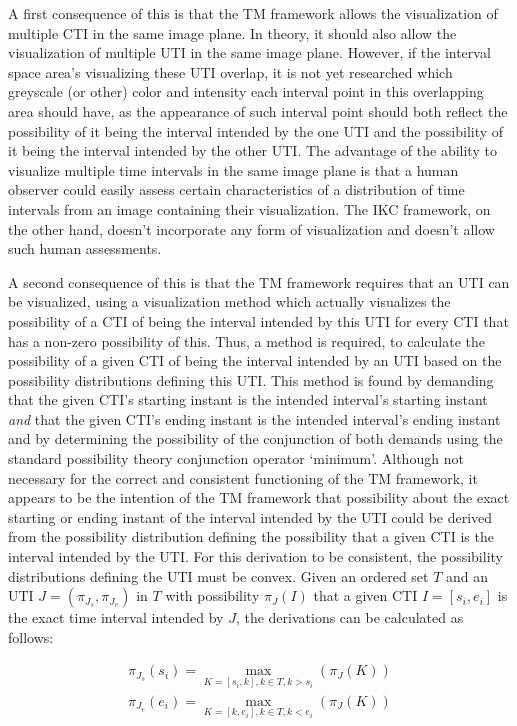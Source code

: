 A first consequence of this is that the TM framework allows the visualization of multiple CTI in the same image plane. In theory, it should also allow the visualization of multiple UTI in the same image plane. However, if the interval space area's visualizing these UTI overlap, it is not yet researched which greyscale (or other) color and intensity each interval point in this overlapping area should have, as the appearance of such interval point should both reflect the possibility of it being the interval intended by the one UTI and the possibility of it being the interval intended by the other UTI. The advantage of the ability to visualize multiple time intervals in the same image plane is that a human observer could easily assess certain characteristics of a distribution of time intervals from an image containing their visualization. The IKC framework, on the other hand, doesn't incorporate any form of visualization and doesn't allow such human assessments.

A second consequence of this is that the TM framework requires that an UTI can be visualized, using a visualization method which actually visualizes the possibility of a CTI of being the interval intended by this UTI for every CTI that has a non-zero possibility of this. Thus, a method is required, to calculate the possibility of a given CTI of being the interval intended by an UTI based on the possibility distributions defining this UTI. This method is found by demanding that the given CTI's starting instant is the intended interval's starting instant \emph{and} that the given CTI's ending instant is the intended interval's ending instant and by determining the possibility of the conjunction of both demands using the standard possibility theory conjunction operator `minimum'. Although not necessary for the correct and consistent functioning of the TM framework, it appears to be the intention of the TM framework that possibility about the exact starting or ending instant of the interval intended by the UTI could be derived from the possibility distribution defining the possibility that a given CTI is the interval intended by the UTI. For this derivation to be consistent, the possibility distributions defining the UTI must be convex. Given an ordered set $T$ and an UTI $J = (\pi_{J_s}, \pi_{J_e})$ in $T$ with possibility $\pi_J(I)$ that a given CTI $I = \left[s_i, e_i\right]$ is the exact time interval intended by $J$, the derivations can be calculated as follows:

\begin{align}
\pi_{J_s}(s_i) = \max_{K = \left[s_i, k\right], k \in T, k > s_i}(\pi_J(K)) \nonumber \\
\pi_{J_e}(e_i) = \max_{K = \left[k, e_i\right], k \in T, k < e_i}(\pi_J(K)) \nonumber
\end{align}


